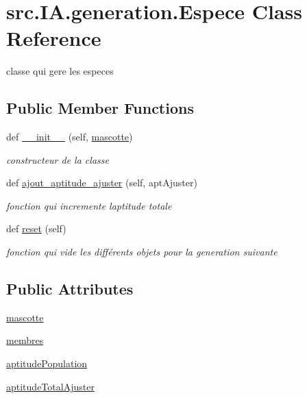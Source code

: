 \hypertarget{classsrc_1_1_i_a_1_1generation_1_1_espece}{}\section{src.\+I\+A.\+generation.\+Espece Class Reference}
\label{classsrc_1_1_i_a_1_1generation_1_1_espece}


classe qui gere les especes  


\subsection*{Public Member Functions}
\begin{DoxyCompactItemize}
\item 
def \hyperlink{classsrc_1_1_i_a_1_1generation_1_1_espece_a242b549a5f7bd71ac2ad81dd149c0b90}{\+\_\+\+\_\+init\+\_\+\+\_\+} (self, \hyperlink{classsrc_1_1_i_a_1_1generation_1_1_espece_a5748e5a3543d4e3ebdcc56981f285f5f}{mascotte})
\begin{DoxyCompactList}\small\item\em constructeur de la classe \end{DoxyCompactList}\item 
def \hyperlink{classsrc_1_1_i_a_1_1generation_1_1_espece_acad3e282587c6af38e5d4e6adbbcff7f}{ajout\+\_\+aptitude\+\_\+ajuster} (self, apt\+Ajuster)
\begin{DoxyCompactList}\small\item\em fonction qui incremente l\textquotesingle{}aptitude totale \end{DoxyCompactList}\item 
def \hyperlink{classsrc_1_1_i_a_1_1generation_1_1_espece_adc4651cd3b27b03fdb3d3c45fcda58c4}{reset} (self)
\begin{DoxyCompactList}\small\item\em fonction qui vide les différents objets pour la generation suivante \end{DoxyCompactList}\end{DoxyCompactItemize}
\subsection*{Public Attributes}
\begin{DoxyCompactItemize}
\item 
\hyperlink{classsrc_1_1_i_a_1_1generation_1_1_espece_a5748e5a3543d4e3ebdcc56981f285f5f}{mascotte}
\item 
\hyperlink{classsrc_1_1_i_a_1_1generation_1_1_espece_a1e2105d31625e972fde7c016978b7bb3}{membres}
\item 
\hyperlink{classsrc_1_1_i_a_1_1generation_1_1_espece_a92404cd84bd75c92fbcc3e2407484182}{aptitude\+Population}
\item 
\hyperlink{classsrc_1_1_i_a_1_1generation_1_1_espece_a7ba309a4604c67b845a92e85f72dd33b}{aptitude\+Total\+Ajuster}
\end{DoxyCompactItemize}


